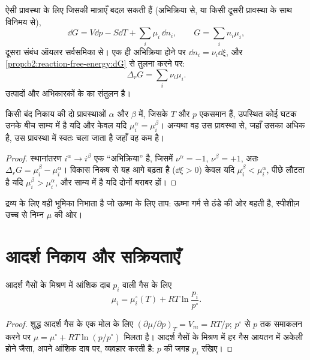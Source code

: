 ऐसी प्रावस्था के लिए जिसकी मात्राएँ बदल सकती हैं (अभिक्रिया से, या किसी
दूसरी प्रावस्था के साथ विनिमय से),
\[
  \dd G = V\dd p - S\dd T + \sum_i\mu_i\,\dd n_i ,\qquad G = \sum_i n_i\mu_i ,
\]
दूसरा संबंध ऑयलर सर्वसमिका से। एक ही अभिक्रिया होने पर $\dd n_i =
\nu_i\dd\xi$, और \cref{prop:b2:reaction-free-energy:dG} से तुलना करने पर:
\[
  \Delta_r G = \sum_i\nu_i\mu_i .
\]
 उत्पादों और अभिकारकों के  का
संतुलन है।

\begin{theorem}[प्रावस्थाओं के बीच साम्य]\label{thm:b2:chemical-potential:phase-equilibrium}
किसी बंद निकाय की दो प्रावस्थाओं $\alpha$ और $\beta$ में, जिसके $T$ और $p$
एकसमान हैं, उपस्थित कोई घटक उनके बीच साम्य में है यदि और केवल यदि
$\mu_i^\alpha = \mu_i^\beta$। अन्यथा वह उस प्रावस्था से, जहाँ उसका  अधिक है, उस प्रावस्था में स्वतः चला जाता है जहाँ वह कम है।
\end{theorem}

\begin{proof}
स्थानांतरण $i^\alpha \to i^\beta$ एक ``अभिक्रिया'' है, जिसमें $\nu^\alpha = -1$,
$\nu^\beta = +1$, अतः $\Delta_r G = \mu_i^\beta - \mu_i^\alpha$। विकास
निकष से यह आगे बढ़ता है ($\dd\xi > 0$) केवल यदि $\mu_i^\beta <
\mu_i^\alpha$, पीछे लौटता है यदि $\mu_i^\beta > \mu_i^\alpha$, और
साम्य में है यदि दोनों बराबर हों।
\end{proof}

द्रव्य के लिए  वही भूमिका निभाता है जो ऊष्मा के लिए ताप:
ऊष्मा गर्म से ठंडे की ओर बहती है, स्पीशीज़ उच्च से निम्न $\mu$ की ओर।

\section{आदर्श निकाय और सक्रियताएँ}

\begin{proposition}[आदर्श गैस का रासायनिक विभव]\label{prop:b2:chemical-potential:mu-gas}
आदर्श गैसों के मिश्रण में आंशिक दाब $p_i$ वाली गैस के लिए
\[
  \mu_i = \mu_i^\circ(T) + RT\ln\frac{p_i}{p^\circ} .
\]
\end{proposition}

\begin{proof}
शुद्ध आदर्श गैस के एक मोल के लिए $(\partial\mu/\partial p)_T = V_m =
RT/p$; $p^\circ$ से $p$ तक समाकलन करने पर $\mu = \mu^\circ + RT\ln(p/p^\circ)$ मिलता है।
आदर्श गैसों के मिश्रण में हर गैस आयतन में अकेली होने जैसा, अपने
आंशिक दाब पर, व्यवहार करती है: $p$ की जगह $p_i$ रखिए।
\end{proof}


